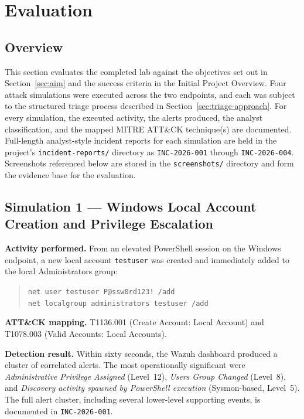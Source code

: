 \section{Evaluation}
\label{sec:evaluation}

\subsection{Overview}

This section evaluates the completed lab against the objectives set out in
Section~\ref{sec:aim} and the success criteria in the Initial Project
Overview. Four attack simulations were executed across the two endpoints,
and each was subject to the structured triage process described in
Section~\ref{sec:triage-approach}. For every simulation, the executed
activity, the alerts produced, the analyst classification, and the mapped
MITRE ATT\&CK technique(s) are documented. Full-length analyst-style
incident reports for each simulation are held in the project's
\texttt{incident-reports/} directory as \texttt{INC-2026-001} through
\texttt{INC-2026-004}. Screenshots referenced below are stored in the
\texttt{screenshots/} directory and form the evidence base for the
evaluation.

\subsection{Simulation 1 --- Windows Local Account Creation and Privilege Escalation}
\label{sec:sim1}

\textbf{Activity performed.} From an elevated PowerShell session on the
Windows endpoint, a new local account \texttt{testuser} was created and
immediately added to the local Administrators group:

\begin{quote}\small
\texttt{net user testuser P@ssw0rd123! /add}\\
\texttt{net localgroup administrators testuser /add}
\end{quote}

\textbf{ATT\&CK mapping.} T1136.001 (Create Account: Local Account) and
T1078.003 (Valid Accounts: Local Accounts).

\textbf{Detection result.} Within sixty seconds, the Wazuh dashboard
produced a cluster of correlated alerts. The most operationally significant
were \textit{Administrative Privilege Assigned} (Level~12), \textit{Users
Group Changed} (Level~8), and \textit{Discovery activity spawned by
PowerShell execution} (Sysmon-based, Level~5). The full alert cluster,
including several lower-level supporting events, is documented in
\texttt{INC-2026-001}.

